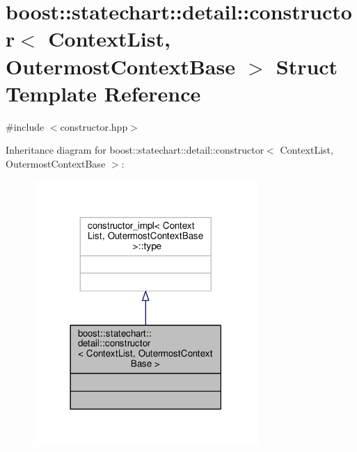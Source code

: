 \hypertarget{structboost_1_1statechart_1_1detail_1_1constructor}{}\section{boost\+:\+:statechart\+:\+:detail\+:\+:constructor$<$ Context\+List, Outermost\+Context\+Base $>$ Struct Template Reference}
\label{structboost_1_1statechart_1_1detail_1_1constructor}


{\ttfamily \#include $<$constructor.\+hpp$>$}



Inheritance diagram for boost\+:\+:statechart\+:\+:detail\+:\+:constructor$<$ Context\+List, Outermost\+Context\+Base $>$\+:
\nopagebreak
\begin{figure}[H]
\begin{center}
\leavevmode
\includegraphics[width=242pt]{structboost_1_1statechart_1_1detail_1_1constructor__inherit__graph}
\end{center}
\end{figure}


